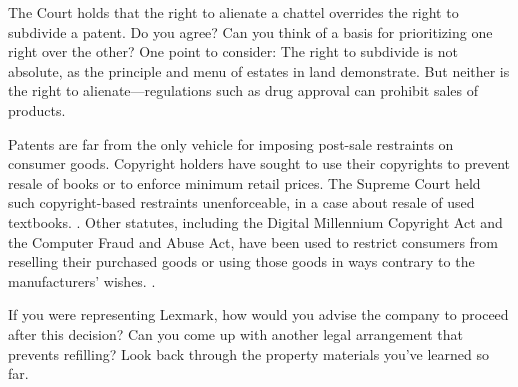 The Court holds that the right to alienate a chattel overrides the right to
subdivide a patent. Do you agree? Can you think of a basis for prioritizing one
right over the other? One point to consider: The right to subdivide is not
absolute, as the \emph{} principle and menu of estates
in land
demonstrate. But neither is the right to alienate---regulations such as drug
approval can prohibit sales of products.






\item Patents are far from the only vehicle for imposing post-sale restraints on
consumer goods. Copyright holders have sought to use their copyrights to prevent
resale of books or to enforce minimum retail prices. The Supreme Court held such
copyright-based restraints unenforceable, in a case about resale of used
textbooks. . Other statutes, including the Digital
Millennium Copyright Act and the Computer Fraud and Abuse Act, have been used to
restrict consumers from reselling their purchased goods or using those goods in
ways contrary to the manufacturers' wishes. .


\item If you were representing Lexmark, how would you advise the company to
proceed after this decision? Can you come up with another legal arrangement that
prevents refilling? Look back through the property materials you've learned so
far.
